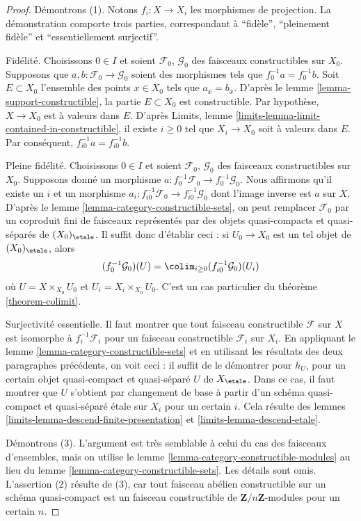 \begin{proof}
Démontrons (1). Notons $f_i : X \to X_i$ les morphismes de projection.
La démonstration comporte trois parties, correspondant à ``fidèle'',
``pleinement fidèle'' et ``essentiellement surjectif''.

\medskip\noindent
Fidélité. Choisissons $0 \in I$ et soient $\mathcal{F}_0$, $\mathcal{G}_0$ des
faisceaux constructibles sur $X_0$. Supposons que
$a, b : \mathcal{F}_0 \to \mathcal{G}_0$ soient des morphismes tels que
$f_0^{-1}a = f_0^{-1}b$. Soit $E \subset X_0$ l'ensemble
des points $x \in X_0$ tels que $a_{\overline{x}} = b_{\overline{x}}$.
D'après le lemme \ref{lemma-support-constructible}, la partie
$E \subset X_0$ est constructible. Par hypothèse, $X \to X_0$ est à valeurs dans $E$.
D'après Limits, lemme \ref{limits-lemma-limit-contained-in-constructible},
il existe $i \geq 0$ tel que $X_i \to X_0$ soit à valeurs dans $E$.
Par conséquent, $f_{i0}^{-1}a = f_{i0}^{-1}b$.

\medskip\noindent
Pleine fidélité. Choisissons $0 \in I$ et soient $\mathcal{F}_0$, $\mathcal{G}_0$ des
faisceaux constructibles sur $X_0$. Supposons donné un morphisme
$a : f_0^{-1}\mathcal{F}_0 \to f_0^{-1}\mathcal{G}_0$.
Nous affirmons qu'il existe un $i$ et un morphisme
$a_i : f_{i0}^{-1}\mathcal{F}_0 \to f_{i0}^{-1}\mathcal{G}_0$
dont l'image inverse est $a$ sur $X$.
D'après le lemme \ref{lemma-category-constructible-sets},
on peut remplacer $\mathcal{F}_0$
par un coproduit fini de faisceaux représentés par des objets quasi-compacts
et quasi-séparés de $(X_0)_\etale$.
Il suffit donc d'établir ceci : si $U_0 \to X_0$ est un tel objet
de $(X_0)_\etale$, alors
$$
(f_0^{-1}\mathcal{G}_0)(U) = \colim_{i \geq 0} (f_{i0}^{-1}\mathcal{G}_0)(U_i)
$$
où $U = X \times_{X_0} U_0$ et $U_i = X_i \times_{X_0} U_0$.
C'est un cas particulier du théorème \ref{theorem-colimit}.

\medskip\noindent
Surjectivité essentielle. Il faut montrer que tout faisceau constructible $\mathcal{F}$
sur $X$ est isomorphe à $f_i^{-1}\mathcal{F}_i$ pour un faisceau constructible
$\mathcal{F}_i$ sur $X_i$. En appliquant le
lemme \ref{lemma-category-constructible-sets}
et en utilisant les résultats des deux paragraphes précédents, on voit ceci :
il suffit de le démontrer pour $h_U$, pour un certain objet quasi-compact
et quasi-séparé $U$ de $X_\etale$.
Dans ce cas, il faut montrer que $U$ s'obtient par changement de base à partir d'un
schéma quasi-compact et quasi-séparé \'etale sur $X_i$ pour un certain $i$.
Cela résulte des
lemmes \ref{limits-lemma-descend-finite-presentation} et
\ref{limits-lemma-descend-etale}.

\medskip\noindent
Démontrons (3). L'argument est très semblable à celui du cas des
faisceaux d'ensembles, mais on utilise le
lemme \ref{lemma-category-constructible-modules}
au lieu du
lemme \ref{lemma-category-constructible-sets}. Les détails sont omis.
L'assertion (2) résulte de (3), car tout faisceau abélien constructible
sur un schéma quasi-compact est un faisceau constructible de
$\mathbf{Z}/n\mathbf{Z}$-modules pour un certain $n$.
\end{proof}

